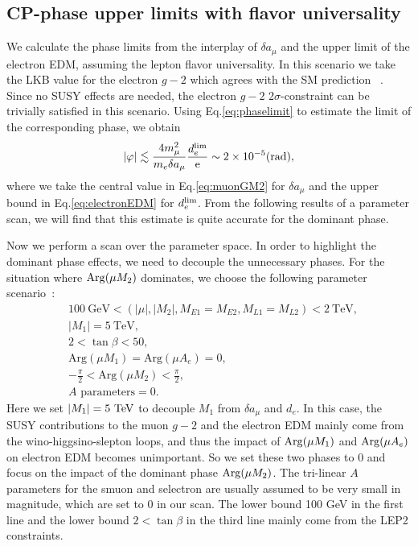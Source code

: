 \documentclass[a4paper,11pt]{article}
\begin{document}
   \subsection{CP-phase upper limits with flavor universality}
   We calculate the phase limits from the interplay of $\delta a_\mu$ and the upper limit of the electron EDM,  assuming the lepton flavor universality. In this scenario we take the LKB value for the electron $g-2$ which agrees with the SM prediction ~\cite{Morel:2020dww,Aoyama:2012wj}. Since no SUSY effects are needed, the electron $g-2$ $2\sigma$-constraint can be trivially satisfied in this scenario.  
   Using Eq.\eqref{eq:phaselimit} to estimate the limit of the corresponding phase, we obtain
   \begin{equation}
       |\varphi|\lesssim\frac{4m_\mu^2}{m_e\delta a_\mu} \frac{d_e^{\rm lim}}{\rm e}\sim 2\times10^{-5}( \text{rad}),
   \end{equation}
   where we take the central value in Eq.\eqref{eq:muonGM2} for $\delta a_\mu$ and  the upper bound in Eq.\eqref{eq:electronEDM} for $d_e^{\rm lim}$. 
   From the following results of a parameter scan, we will find that this estimate is quite accurate for the dominant phase. 
   
   Now we perform a scan over the parameter space. In order to highlight the dominant phase effects, we need to decouple the unnecessary phases. For the situation where ${\rm Arg}(\mu M_2)$ dominates, we choose the following parameter scenario~\cite{Han:2021ify}:
   \begin{align*}
       &100~\text{GeV}<(|\mu|,|M_2|,M_{E1}=M_{E2},M_{L1}=M_{L2})<2~\text{TeV},\\
       &|M_1|=5~\text{TeV},\\
       &2<\tan\beta <50,\\
       &\text{Arg}(\mu M_1)=\text{Arg}(\mu A_e)=0,\\
       &-\frac{\pi}{2}<\text{Arg}(\mu M_2)<\frac{\pi}{2}, \\
       &A\text{ parameters} = 0.
   \end{align*}
   Here we set $|M_1|=5~{\rm TeV}$ to decouple $M_1$ from $\delta a_\mu$ and $d_e$. In this case, the SUSY contributions to the muon $g-2$ and the electron EDM mainly come from the wino-higgsino-slepton loops, and thus the impact of ${\rm Arg}(\mu M_1)$ and ${\rm Arg}(\mu A_e)$ on electron EDM becomes unimportant. So we set these two phases to $0$ and focus on the impact of the dominant phase ${\rm Arg}(\mu M_2)$. The tri-linear $A$ parameters for the smuon and selectron are usually assumed to be very small in magnitude, which are set to 0 in our scan. The lower bound 100 GeV in the first line and the lower bound $2 <\tan\beta$ in the third line 
   mainly come from the LEP2 constraints.
   
\end{document}

